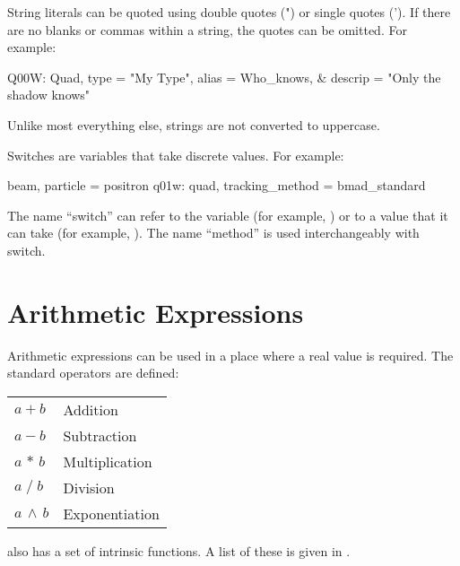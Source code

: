 String literals can be quoted using double quotes (") or single quotes ('). 
If there are no
blanks or commas within a string, the quotes can be omitted. For example:
\begin{example}
  Q00W: Quad, type = "My Type", alias = Who_knows, &
                                  descrip = "Only the shadow knows"
\end{example}
Unlike most everything else, strings are not converted to uppercase.

Switches are variables that take discrete values. For example:
\begin{example}
  beam, particle = positron          
  q01w: quad, tracking\_method = bmad\_standard 
\end{example}
The name ``switch'' can refer to the variable (for example,
) or to a value that it can take (for example,
). The name ``method'' is used interchangeably with switch.

\section{Arithmetic Expressions}

Arithmetic expressions can be used in a place where a real value is required.
The standard operators are defined: \hfil\break
\hspace*{0.15in}
\begin{tabular}{ll}
  $a + b$           & Addition        \\
  $a - b$           & Subtraction     \\
  $a \, \ast \, b$  & Multiplication  \\
  $a \; / \; b$     & Division        \\
  $a \, \land \, b$ & Exponentiation  \\
\end{tabular}
\bmad also has a set of intrinsic functions. A list of these is given
in .

